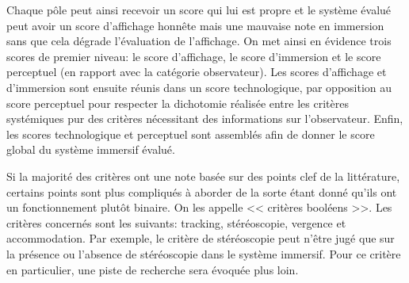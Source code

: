 	\par Chaque pôle peut ainsi recevoir un score qui lui est propre et le système évalué peut avoir un score d'affichage honnête mais une mauvaise note en immersion sans que cela dégrade l'évaluation de l'affichage. On met ainsi en évidence trois scores de premier niveau: le score d'affichage, le score d'immersion et le score perceptuel (en rapport avec la catégorie observateur). Les scores d'affichage et d'immersion sont ensuite réunis dans un score technologique, par opposition au score perceptuel pour respecter la dichotomie réalisée entre les critères systémiques pur des critères nécessitant des informations sur l'observateur. Enfin, les scores technologique et perceptuel sont assemblés afin de donner le score global du système immersif évalué.
	
	\par Si la majorité des critères ont une note basée sur des points clef de la littérature, certains points sont plus compliqués à aborder de la sorte étant donné qu'ils ont un fonctionnement plutôt binaire. On les appelle << critères booléens >>. Les critères concernés sont les suivants: tracking, stéréoscopie, vergence et accommodation. Par exemple, le critère de stéréoscopie peut n'être jugé que sur la présence ou l'absence de stéréoscopie dans le système immersif. Pour ce critère en particulier, une piste de recherche sera évoquée plus loin.
	
